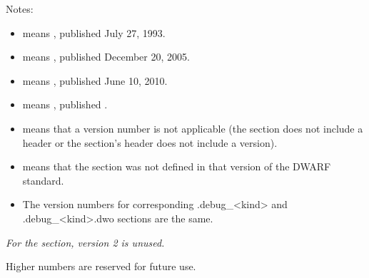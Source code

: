 Notes:

\begin{itemize}
\item  {} means , published July 27, 1993.
\item  {} means , published December 20, 2005.
\item  {} means , published June 10, 2010.
\item  {} means , published 
			.
\item  \doublequote{*} means that a version number is not applicable
(the section does not include a header or the section's header does not include a version).

\item  \doublequote{-} means that the section was not defined in that
version of the DWARF standard.

\item  The version numbers for corresponding .debug\_<kind> and .debug\_<kind>.dwo 
sections are the same.

\end{itemize}

\textit{For the \dotdebugframe{} section, version 2 is unused.}

Higher numbers are reserved for future use.

